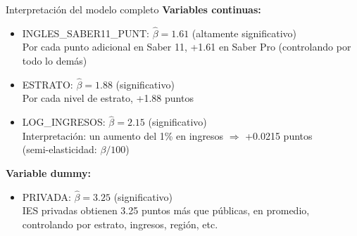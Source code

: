 \documentclass[aspectratio=169, 11pt]{beamer}
\begin{document}
\begin{frame}{Interpretación del modelo completo}
\textbf{Variables continuas:}
\begin{itemize}
  \item INGLES\_SABER11\_PUNT: $\hat{\beta} = 1.61$ (altamente significativo)\\
    Por cada punto adicional en Saber 11, +1.61 en Saber Pro (controlando por todo lo demás)

  \item ESTRATO: $\hat{\beta} = 1.88$ (significativo)\\
    Por cada nivel de estrato, +1.88 puntos

  \item LOG\_INGRESOS: $\hat{\beta} = 2.15$ (significativo)\\
    Interpretación: un aumento del 1\% en ingresos $\Rightarrow$ +0.0215 puntos\\
    (semi-elasticidad: $\beta/100$)
\end{itemize}

\vspace{0.2cm}
\textbf{Variable dummy:}
\begin{itemize}
  \item PRIVADA: $\hat{\beta} = 3.25$ (significativo)\\
    IES privadas obtienen 3.25 puntos más que públicas, en promedio, controlando por estrato, ingresos, región, etc.
\end{itemize}
\end{frame}
\end{document}
